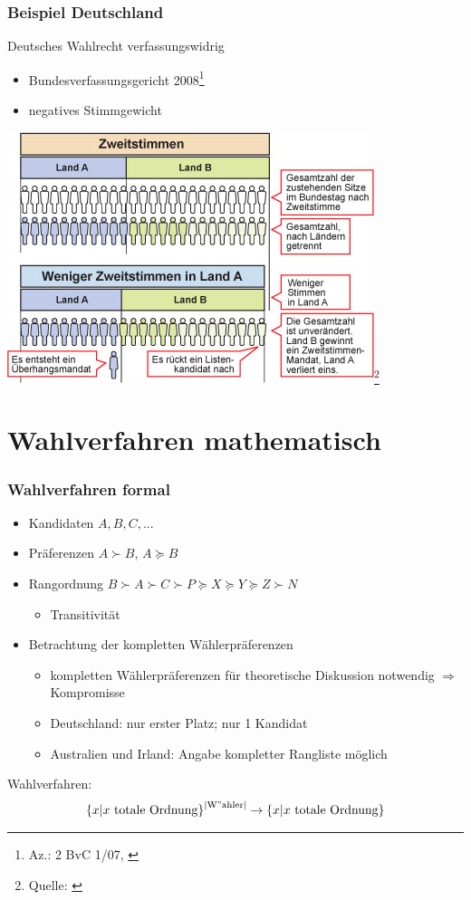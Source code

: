 \documentclass{beamer}
\begin{document}
\begin{frame}[fragile]
	\frametitle{Beispiel Deutschland}
	
	Deutsches Wahlrecht verfassungswidrig
	\begin{itemize}
		\item Bundesverfassungsgericht 2008\footnote{Az.: 2 BvC 1/07, \cite{handelsblattverf, spiegelverf}}
		\item negatives Stimmgewicht
	\end{itemize}

	\begin{center}
	\includegraphics[width=0.5\linewidth]{Neg-Simmen-Gewicht3}\footnote{Quelle: \cite{imgnegstim}}
	\end{center}
\end{frame}

\section{Wahlverfahren mathematisch}
\begin{frame}[fragile]
	\frametitle{Wahlverfahren formal \cite{hodge2005mathematics, bungartz}}
	
	\begin{itemize}
		\item Kandidaten $A, B, C, ...$
		\item Präferenzen $ A \succ B $, $ A \succeq B$
		\pause
		\item Rangordnung $ B \succ A \succ C \succ P \succeq X \succeq Y \succeq Z \succ N $
		\begin{itemize}
			\item Transitivität
		\end{itemize}
		\pause
		\item Betrachtung der kompletten Wählerpräferenzen
		\pause
		\begin{itemize}
			\item kompletten Wählerpräferenzen für theoretische Diskussion notwendig $\Rightarrow$ Kompromisse
			\item Deutschland: nur erster Platz; nur 1 Kandidat
			\item Australien und Irland: Angabe kompletter Rangliste möglich \cite{spektrum}
		\end{itemize}
	\end{itemize}
	\pause
	Wahlverfahren: 
	$$ \left\{ x | x \ \mathrm{totale\ Ordnung} \right\} ^{|\mathrm{W"ahler}|} \rightarrow \left\{ x | x \ \mathrm{totale\ Ordnung} \right\}$$

\end{frame}
\end{document}
